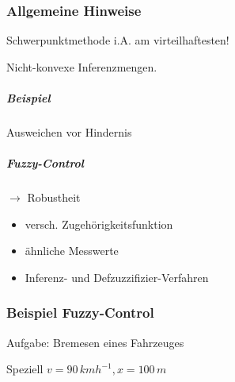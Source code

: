 \documentclass[a4paper]{scrartcl}
\begin{document}
\subsubsection{Allgemeine Hinweise}
Schwerpunktmethode i.A. am virteilhaftesten!

Nicht-konvexe Inferenzmengen.
\subparagraph{Beispiel} Ausweichen vor Hindernis
\subparagraph{Fuzzy-Control} $\rightarrow$ Robustheit
\begin{itemize}
\item versch. Zugehörigkeitsfunktion
\item ähnliche Messwerte
\item Inferenz- und Defzuzzifizier-Verfahren
\end{itemize}

\subsubsection{Beispiel Fuzzy-Control}
Aufgabe: Bremesen eines Fahrzeuges

Speziell $v= 90\, km h^{-1} , x = 100\,m$
\end{document}
